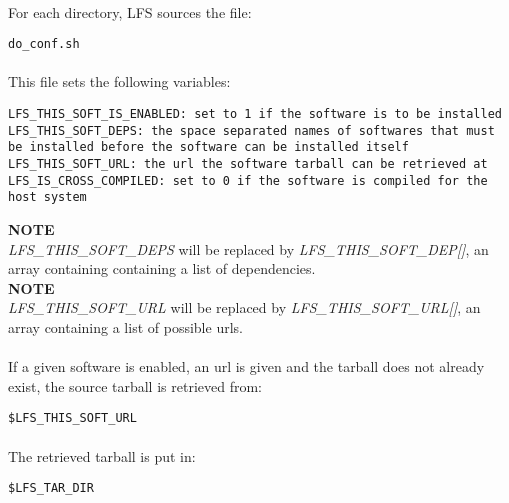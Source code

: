 \documentclass[a4paper, 11pt]{article}
\begin{document}
\paragraph{}
For each directory, LFS sources the file:\\

\begin{lstlisting}[frame=tb]
do_conf.sh
\end{lstlisting}

\paragraph{}
This file sets the following variables:\\

\begin{lstlisting}[frame=tb]
LFS_THIS_SOFT_IS_ENABLED: set to 1 if the software is to be installed
LFS_THIS_SOFT_DEPS: the space separated names of softwares that must
be installed before the software can be installed itself
LFS_THIS_SOFT_URL: the url the software tarball can be retrieved at
LFS_IS_CROSS_COMPILED: set to 0 if the software is compiled for the
host system
\end{lstlisting}
\textbf{NOTE}\\
\textit{LFS\_THIS\_SOFT\_DEPS} will be replaced by
\textit{LFS\_THIS\_SOFT\_DEP[]}, an array containing containing a list of
dependencies.\\
\textbf{NOTE}\\
\textit{LFS\_THIS\_SOFT\_URL} will be replaced by
\textit{LFS\_THIS\_SOFT\_URL[]}, an array containing a list of possible urls.

\paragraph{}
If a given software is enabled, an url is given and the tarball does not already
exist, the source tarball is retrieved from:\\

\begin{lstlisting}[frame=tb]
$LFS_THIS_SOFT_URL
\end{lstlisting}

\paragraph{}
The retrieved tarball is put in:\\
\begin{lstlisting}[frame=tb]
$LFS_TAR_DIR
\end{lstlisting}
\end{document}
